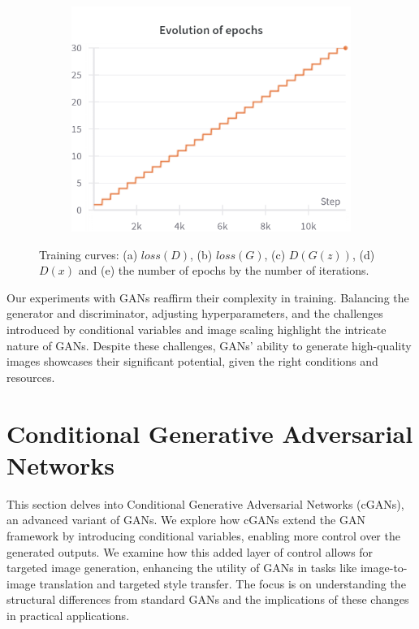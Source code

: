 \begin{figure}[H]
    \begin{subfigure}{0.45\textwidth}
        \centering
        \includegraphics[width=0.95\linewidth]{cifar10/64_nz100/epochs.png}
        \caption{}
        \label{subfig:cifar10/64_nz100/epochs}
    \end{subfigure}%

    \caption{Training curves: (a) $loss(D)$, (b) $loss(G)$, (c) $D(G(z))$, (d) $D(x)$ and (e) the number of epochs by the number of iterations.}
    \label{fig:cifar10_64_nz100_curves}
\end{figure}

Our experiments with GANs reaffirm their complexity in training. Balancing the generator and discriminator, adjusting hyperparameters, and the challenges introduced by conditional variables and image scaling highlight the intricate nature of GANs. Despite these challenges, GANs' ability to generate high-quality images showcases their significant potential, given the right conditions and resources.

\section{Conditional Generative Adversarial Networks}

This section delves into Conditional Generative Adversarial Networks (cGANs), an advanced variant of GANs. We explore how cGANs extend the GAN framework by introducing conditional variables, enabling more control over the generated outputs. We examine how this added layer of control allows for targeted image generation, enhancing the utility of GANs in tasks like image-to-image translation and targeted style transfer. The focus is on understanding the structural differences from standard GANs and the implications of these changes in practical applications.

